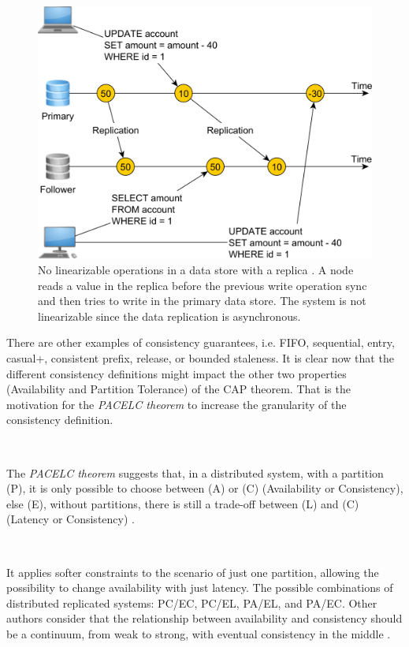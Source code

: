 \documentclass[12pt,english]{article} %
\begin{document}
\begin{figure}[H]
    \centering
    \includegraphics[width=0.7\linewidth]{img/db/operation/no-linearizable-operations.png}
    \caption{No linearizable operations in a data store with a replica  \cite{linearizability-question-stackoverflow}. A node reads a value in the replica before the previous write operation sync and then tries to write in the primary data store.
    The system is not linearizable since the data replication is asynchronous.\label{fig:no-linearizable-operations}}
\end{figure}


There are other examples of consistency guarantees, i.e. FIFO, sequential, entry, casual+, consistent prefix, release, or bounded staleness.
It is clear now that the different consistency definitions might impact the other two properties (Availability and Partition Tolerance) of the CAP theorem.
That is the motivation for the \textit{PACELC theorem} to increase the granularity of the consistency definition.

\

The \textit{PACELC theorem} suggests that, in a distributed system, with a partition (P), it is only possible to choose between (A) or (C) (Availability or Consistency), else (E), without partitions, there is still a trade-off between (L) and (C) (Latency or Consistency) \cite{trade-offs-fault-tolerant-distributed-computing-databases}.

\

It applies softer constraints to the scenario of just one partition, allowing the possibility to change availability with just latency.
The possible combinations of distributed replicated systems: PC/EC, PC/EL, PA/EL, and PA/EC.
Other authors consider that the relationship between availability and consistency should be a continuum, from weak to strong, with eventual consistency in the middle \cite{trade-offs-fault-tolerant-distributed-computing-databases}.
\end{document}

